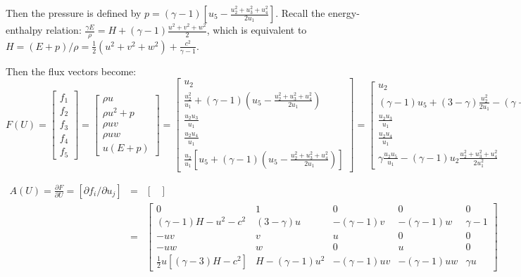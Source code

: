 \documentclass{article}
\begin{document}
Then the pressure is defined by $p=(\gamma-1)[u_5-\frac{u_2^2+u_3^2+u_4^2}{2u_1} ]$.
Recall the energy-enthalpy relation: $\frac{\gamma E}{\rho} = H+(\gamma-1)\frac{u^2+v^2+w^2}{2}$, which is equivalent to $H = (E+p)/\rho = \frac{1}{2}(u^2+v^2+w^2)+\frac{c^2}{\gamma-1}$.

Then the flux vectors become:
\begin{equation}
  F(U) = \left[
    \begin{array}{c}
      f_1 \\
      f_2 \\
      f_3 \\
      f_4 \\
      f_5
    \end{array}
  \right] = \left[
    \begin{array}{c}
      \rho u\\
      \rho u^2 + p\\
      \rho u v\\
      \rho u w\\
      u(E+p)
    \end{array}
  \right] = \left[
    \begin{array}{c}
      u_2\\
      \frac{u_2^2}{u_1} + (\gamma-1) (u_5-\frac{u_2^2+u_3^2+u_4^2}{2u_1})\\
      \frac{u_2 u_3}{u_1}\\
      \frac{u_2 u_4}{u_1}\\
      \frac{u_2}{u_1} [ u_5 + (\gamma-1)(u_5-\frac{u_2^2+u_3^2+u_4^2}{2u_1}) ]
    \end{array}
  \right] = \left[
    \begin{array}{c}
      u_2\\
      (\gamma-1)u_5 + (3-\gamma)\frac{u_2^2}{2u_1} - (\gamma-1)\frac{u_3^2+u_4^2}{2u_1}\\
      \frac{u_2 u_3}{u_1}\\
      \frac{u_2 u_4}{u_1}\\
      \gamma \frac{u_2 u_5}{u_1} - (\gamma-1) u_2 \frac{u_2^2+u_3^2+u_4^2}{2 u_1^2}
    \end{array}
  \right]
\end{equation}


\begin{eqnarray}
  A(U) = \frac{\partial F}{\partial U} = \left[ \partial f_i/\partial u_j \right] & = & \left[
    \begin{array}{ccccc}
      
    \end{array}
  \right]\\
  & = & \left[
    \begin{array}{ccccc}
      0 & 1 & 0 & 0 & 0\\
      (\gamma-1)H- u^2-c^2 & (3-\gamma) u & -(\gamma-1)v & -(\gamma-1)w & \gamma-1\\
      -u v & v & u & 0 & 0\\
      -u w & w & 0 & u & 0\\
      \frac{1}{2} u [(\gamma-3)H-c^2] & H-(\gamma-1)u^2 & -(\gamma-1)uv &-(\gamma-1)uw & \gamma u
    \end{array}
   \right]
\end{eqnarray}
\end{document}
